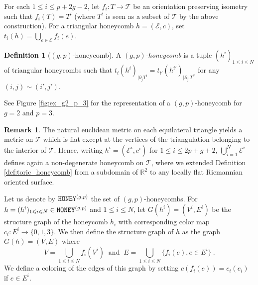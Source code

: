 \documentclass[11pt,a4paper]{amsart}
\providecommand{\honey}{\texttt{\textsc{HONEY}}}
\numberwithin{equation}{section}
\theoremstyle{definition}
\newtheorem{definition}[theorem]{Definition}
\newtheorem{remark}[theorem]{Remark}
\begin{document}
For each $1\leqslant i\leqslant p+2g-2$, let $f_i:T\rightarrow \mathcal{T}$ be an orientation preserving isometry such that $f_i(T)=T^i$ (where $T^i$ is seen as a subset of $\mathcal{T}$ by the above construction). For a triangular honeycomb $h=(\mathcal{E},c)$, set $t_i(h)=\bigcup_{e\in\mathcal{E}}f_i(e)$. 
\begin{definition}[$(g,p)$-honeycomb]\label{def:(g,p)_honey}
A \textit{$(g,p)$-honeycomb }is a tuple $(h^i)_{1\leqslant i\leqslant N}$ of triangular honeycombs such that 
$t_i(h^i)_{\vert \partial_j T^i}=t_{i'}(h^{i'})_{\vert \partial_{j'}T^{i'}}$ for any $(i,j)\sim(i',j')$.
\end{definition} 
See Figure \ref{fig:ex_g2_p_3} for the representation of a $(g,p)$-honeycomb for $g=2$ and $p=3$.
\begin{remark}
The natural euclidean metric on each equilateral 
triangle yields a metric on $\mathcal{T}$ which is flat 
except at the vertices of the triangulation belonging to 
the interior of $\mathcal{T}$. Hence,  writing $h^i=(\mathcal{E}^i,c^i)$ for $1\leqslant i\leqslant 2p+g+2$, $\bigcup_{i=1}^{N}\mathcal{E}^i$ defines again a non-degenerate honeycomb on $\mathcal{T}$, where we extended Definition \ref{def:toric_honeycomb} from a subdomain of $\mathbb{R}^2$ to any locally flat Riemannian oriented surface.
\end{remark}


\noindent
Let us denote by $\honey^{(g, p)}$ the set of 
$(g,p)$-honeycombs. For $h=(h^i)_{1\leqslant i\leqslant N}\in\honey^{(g,p)}$ and $1 \leqslant i \leqslant N$, let $G(h^i)=(V^i, E^i)$ be 
the structure graph of the honeycomb $h_i$ with corresponding color map $c_i:E^i\rightarrow \{0,1,3\}$. 
We then define the structure graph of $h$ as the graph $G(h) = (V, E)$ where
$$V = \bigcup_{1\leqslant i\leqslant N}f_i(V^i) \ \text{ and } \ 
E = \bigcup_{1\leqslant i\leqslant N} \{f_i(e), e\in E^i\} \ .$$
We define a coloring of the edges of this graph by setting $c(f_i(e))=c_i(e_i)$ if $e\in E^i$.
\end{document}
